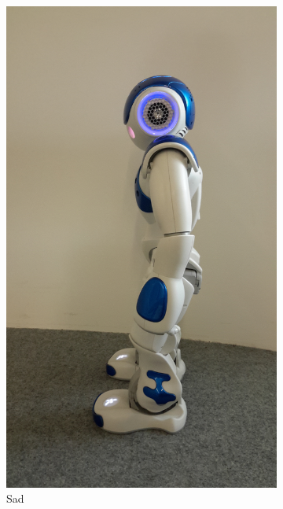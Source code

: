 \begin{figure}[h!]
\begin{subfigure}[b]{0.18\textwidth}
                \includegraphics[width=\textwidth]{figures/sad.jpg}
                \caption{Sad}
                \label{fig:sad}
        \end{subfigure}
        ~ %
        \begin{subfigure}[b]{0.18\textwidth}

\end{subfigure}
\end{figure}
